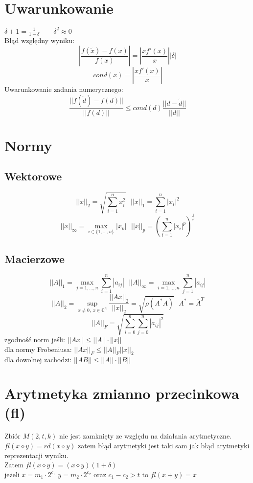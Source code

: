 \documentclass[10pt,twocolumn]{article}
\begin{document}
\begin{flushleft}
\section{Uwarunkowanie}
$\delta+1 = \frac{1}{1-\delta} \qquad \delta^{2} \approx 0$\\
Błąd względny wyniku: $$\left| \frac{f(\widetilde{x}) - f(x)}{f(x)} \right| = \left| \frac{xf'(x)}{x} \right| |\delta|$$
$$cond(x) = \left| \frac{xf'(x)}{x} \right| $$
Uwarunkowanie zadania numerycznego: $$\frac{||f(\widetilde{d}) - f(d)||}{||f(d)||} \leq cond(d) \frac{||d - \widetilde{d}||}{||d||}$$

\section{Normy}
\subsection{Wektorowe}
$$ ||x||_{2} = \sqrt{\sum_{i=1}^{n} x_{i}^{2}} \ \ \ ||x||_{1} = \sum_{i=1}^{n} |x_{i}|^{2} $$
$$ ||x||_{\infty} = \max_{i \in \{1,...,n\}} |x_{k}| \ \ \  ||x||_{p} = \left(\sum_{i=1}^{n}|x_{i}|^{p}\right)^{\frac{1}{p}} $$
\subsection{Macierzowe}
$$ ||A||_{1} = \max_{j=1,...,n} \sum_{i=1}^{n}|a_{ij}| \ \ \ ||A||_{\infty} = \max_{i=1,...,n} \sum_{j=1}^{n}|a_{ij}| $$
$$\mathbb{}$$
$$ ||A||_{2} = \sup_{x \neq 0, \ x \in \mathbb{C}^{n}} \frac{||Ax||_{2}}{||x||_{2}} = \sqrt{\rho\left(A^{*}A\right)} \ \ \ A^{*} = \overline{A}^{T}$$
$$ ||A||_{F} = \sqrt{\sum_{i = 0}^{n} \sum_{j = 0}^{n} |a_{ij}|^{2}} $$
zgodność norm jeśli: $||Ax|| \leq ||A|| \cdot ||x||$\\
dla normy Frobeniusa: $||Ax||_{F} \leq ||A||_{F} ||x||_{2}$\\
dla dowolnej zachodzi: $||AB|| \leq ||A|| \cdot ||B||$

\section{Arytmetyka zmianno przecinkowa (fl)}
Zbiór $M( 2,t,k )$ nie jest zamknięty ze względu na działania arytmetyczne. 
$fl(x \diamond y) = rd(x \diamond y)$ zatem błąd arytmetyki jest taki sam jak błąd arytmetyki reprezentacji wyniku.\\
Zatem $fl(x \diamond y) = (x \diamond y)(1 + \delta) $\\ jeżeli $x = m_{1}\cdot2^{c_{1}}$ $y = m_{2}\cdot2^{c_{2}}$ oraz $c_{1} -c_{2} > t$ to $fl(x+y) = x$


\end{flushleft}
\end{document}
